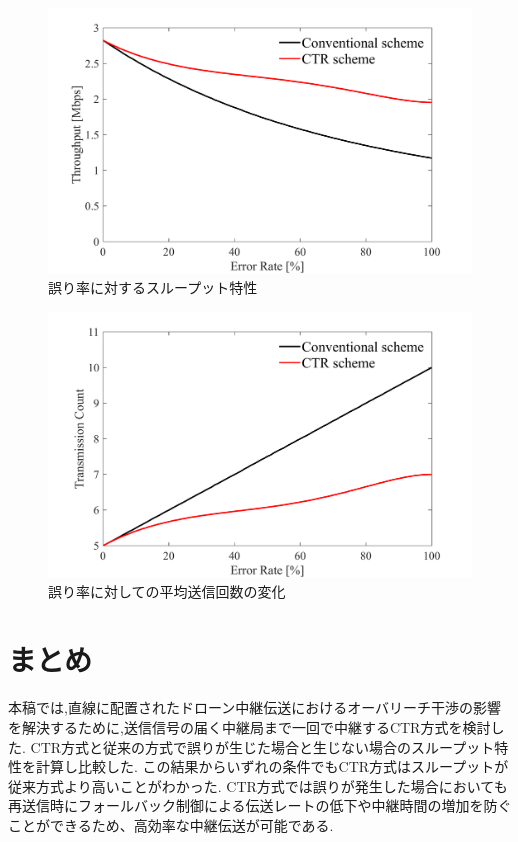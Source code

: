\documentclass[a4paper,10pt]{ltjsarticle}
\begin{document}
\begin{figure}[H]
  \centering
  \includegraphics[width=\linewidth]{throughput_probabilistic_retry_v3.pdf} %
  \caption{誤り率に対するスループット特性}
  \label{fig:throughput_v3} %
\end{figure}
\begin{figure}[H]
  \centering
  \includegraphics[width=\linewidth]{throughput_probabilistic_retry_v3.1.pdf} %
  \caption{誤り率に対しての平均送信回数の変化}
  \label{fig:throughput_v3.1} %
\end{figure}

\section{まとめ}
本稿では,直線に配置されたドローン中継伝送におけるオーバリーチ干渉の影響を解決するために,送信信号の届く中継局まで一回で中継するCTR方式を検討した.
CTR方式と従来の方式で誤りが生じた場合と生じない場合のスループット特性を計算し比較した.
この結果からいずれの条件でもCTR方式はスループットが従来方式より高いことがわかった.
CTR方式では誤りが発生した場合においても再送信時にフォールバック制御による伝送レートの低下や中継時間の増加を防ぐことができるため、高効率な中継伝送が可能である.
\end{document}
